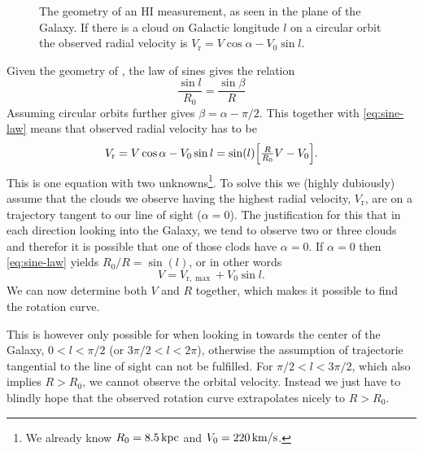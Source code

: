 \documentclass[11pt,a4paper, twocolumn,
swedish, english %
]{article}
\newcommand{\rr}{\mathrm{r}}
\begin{document}

\begin{figure}\centering
\resizebox{0.5\linewidth}{!}{
}
\caption{The geometry of an HI measurement, as seen in the plane of
  the Galaxy. If there is a cloud on Galactic longitude $l$ on a circular
  orbit the observed radial velocity is $V_\rr=V\cos\alpha-V_0\sin l$. }
\label{fig:geom}
\end{figure}

Given the geometry of , the law of sines gives the
relation
\begin{equation}\label{eq:sine-law}
\frac{\sin l}{R_0}=\frac{\sin\beta}{R}
\end{equation}
Assuming circular orbits further gives $\beta=\alpha-\pi/2$.
This together with \eqref{eq:sine-law} means that observed radial
velocity has to be
\begin{equation}\label{eq:Vr}
V_\rr=V\cos\alpha-V_0\sin l
=\sin(l)\qty[\tfrac{R}{R_0}V-V_0].
\end{equation}
This is one equation with two unknowns\footnote{We already know 
  $R_0=\unit[8.5]{kpc}$ and $V_0=\unit[220]{km/s}$.}. To solve this 
we (highly dubiously) assume that the clouds we observe having the
highest radial velocity, $V_\rr$, are on a trajectory tangent to our
line of sight ($\alpha=0$). The justification for this that in each
direction looking into the Galaxy, we tend to observe two or three
clouds and therefor it is possible that one of those clods have
$\alpha=0$. If $\alpha=0$ then \eqref{eq:sine-law} yields
$R_0/R=\sin(l)$, or in other words
\begin{equation}
V=V_{\rr,\max}+V_0\sin l.
\end{equation}
We can now determine both $V$ and $R$ together, which makes it
possible to find  the rotation curve.

This is however only possible for when looking in towards the center
of the Galaxy, $0<l<\pi/2$ (or $3\pi/2<l<2\pi$), otherwise the
assumption of trajectorie tangential to the line of sight can not be
fulfilled. For $\pi/2<l<3\pi/2$, which also implies $R>R_0$, we cannot
observe the orbital velocity. Instead we just have to blindly hope
that the observed rotation curve extrapolates nicely to $R>R_0$.
\end{document}
